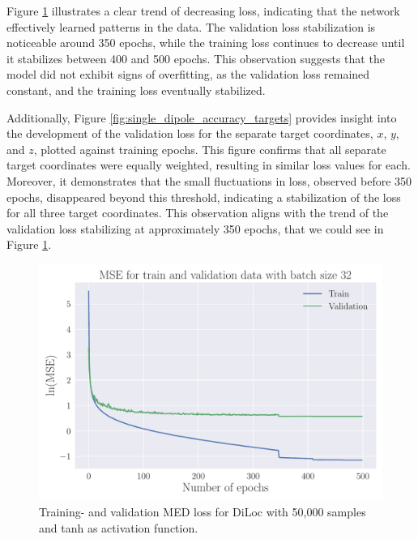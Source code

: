 \documentclass[a4paper, UKenglish, 11pt]{uiomaster}
\begin{document}
Figure \ref{fig:single_dipole_accuracy} illustrates a clear trend of decreasing loss, indicating that the network effectively learned patterns in the data. The validation loss stabilization is noticeable around 350 epochs, while the training loss continues to decrease until it stabilizes between 400 and 500 epochs. This observation suggests that the model did not exhibit signs of overfitting, as the validation loss remained constant, and the training loss eventually stabilized.

Additionally, Figure \ref{fig:single_dipole_accuracy_targets} provides insight into the development of the validation loss for the separate target coordinates, $x$, $y$, and $z$, plotted against training epochs. This figure confirms that all separate target coordinates were equally weighted, resulting in similar loss values for each. Moreover, it demonstrates that the small fluctuations in loss, observed before 350 epochs, disappeared beyond this threshold, indicating a stabilization of the loss for all three target coordinates. This observation aligns with the trend of the validation loss stabilizing at approximately 350 epochs, that we could see in Figure \ref{fig:single_dipole_accuracy}.

\begin{figure}[!htb]
    \centering
    \includegraphics[width=\linewidth]{figures/mse_simple_32_0.001_0.35_0.5_0.0_500_(0).pdf}
    \caption{Training- and validation MED loss for DiLoc with 50,000 samples and tanh as activation function.}
    \label{fig:single_dipole_accuracy}
\end{figure}
\end{document}
